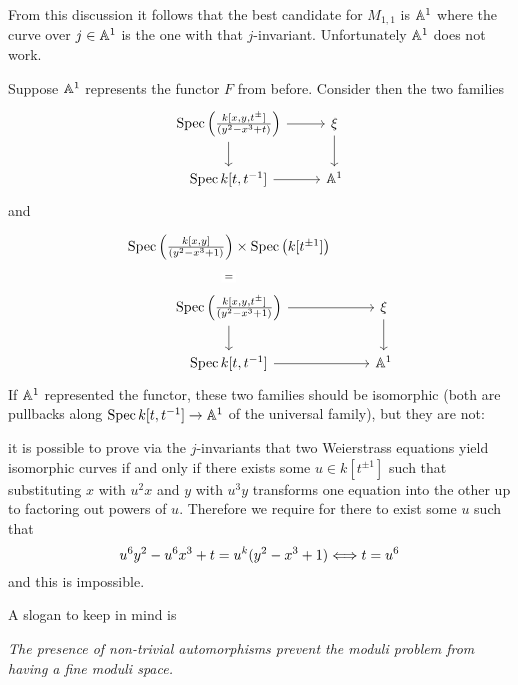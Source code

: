 \noindent
From this discussion it follows that the best candidate for $M_{1,1}$ is $\mathbb{A}^1$ where the curve over $j\in \mathbb{A}^1$ is the one with that $j$-invariant.
Unfortunately $\mathbb{A}^1$ does not work.

\begin{example}
Suppose $\mathbb{A}^1$ represents the functor $F$ from before. Consider then the two families
\[\begin{tikzcd}
	{\Spec\pa{\frac{k[x,y,t^\pm]}{(y^2-x^3+t)}}} & \xi \\
	{\Spec k[t,t\ii]} & {\A^1}
	\arrow[from=1-1, to=1-2]
	\arrow[from=1-1, to=2-1]
	\arrow[from=1-2, to=2-2]
	\arrow[from=2-1, to=2-2]
\end{tikzcd}\]
and
\[\begin{tikzcd}
	{\Spec\pa{\frac{k[x,y]}{(y^2-x^3+1)}}\times\Spec\pa{k[t^{\pm1}]}} \\
	{\Spec\pa{\frac{k[x,y,t^\pm]}{(y^2-x^3+1)}}} & \xi \\
	{\Spec k[t,t\ii]} & {\A^1}
	\arrow["{=}"{description}, draw=none, from=1-1, to=2-1]
	\arrow[from=2-1, to=2-2]
	\arrow[from=2-1, to=3-1]
	\arrow[from=2-2, to=3-2]
	\arrow[from=3-1, to=3-2]
\end{tikzcd}\]
If $\mathbb{A}^1$ represented the functor, these two families should be isomorphic (both are pullbacks along $\operatorname{Spec} k[t,t^{-1}]\to \mathbb{A}^1$ of the universal family), but they are not:

it is possible to prove via the $j$-invariants that two Weierstrass equations yield isomorphic curves if and only if there exists some $u\in k[t^{\pm1}]$ such that substituting $x$ with $u^2x$ and $y$ with $u^3y$ transforms one equation into the other up to factoring out powers of $u$. Therefore we require for there to exist some $u$ such that
\[u^6y^2-u^6x^3+t=u^k(y^2-x^3+1)\Longleftrightarrow t=u^6\]
and this is impossible.
\end{example}

\begin{remark}
A slogan to keep in mind is
\begin{center}
    \textit{The presence of non-trivial automorphisms prevent the moduli problem from having a fine moduli space.}
\end{center}
\end{remark}

